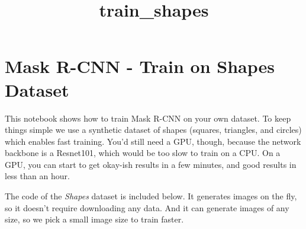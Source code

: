 \documentclass[11pt]{article}
\title{train\_shapes}
\begin{document}
    
    
    \maketitle
    
    

    
    \hypertarget{mask-r-cnn---train-on-shapes-dataset}{%
\section{Mask R-CNN - Train on Shapes
Dataset}\label{mask-r-cnn---train-on-shapes-dataset}}

This notebook shows how to train Mask R-CNN on your own dataset. To keep
things simple we use a synthetic dataset of shapes (squares, triangles,
and circles) which enables fast training. You'd still need a GPU,
though, because the network backbone is a Resnet101, which would be too
slow to train on a CPU. On a GPU, you can start to get okay-ish results
in a few minutes, and good results in less than an hour.

The code of the \emph{Shapes} dataset is included below. It generates
images on the fly, so it doesn't require downloading any data. And it
can generate images of any size, so we pick a small image size to train
faster.
\end{document}
